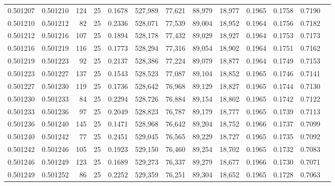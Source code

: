 \begin{tabular}{rrrrrrrrrrrrr}
0.501207 & 0.501210 & 124 &  25 &                                     0.1678 & 527,989 &  77,621 &  88,979 &  18,977 & 0.1965 & 0.1758 & 0.7190 \\
0.501210 & 0.501212 &  82 &  25 &                                     0.2336 & 528,071 &  77,539 &  89,004 &  18,952 & 0.1964 & 0.1756 & 0.7182 \\
0.501212 & 0.501216 & 107 &  25 &                                     0.1894 & 528,178 &  77,432 &  89,029 &  18,927 & 0.1964 & 0.1753 & 0.7173 \\
0.501216 & 0.501219 & 116 &  25 &                                     0.1773 & 528,294 &  77,316 &  89,054 &  18,902 & 0.1964 & 0.1751 & 0.7162 \\
0.501219 & 0.501223 &  92 &  25 &                                     0.2137 & 528,386 &  77,224 &  89,079 &  18,877 & 0.1964 & 0.1749 & 0.7153 \\
0.501223 & 0.501227 & 137 &  25 &                                     0.1543 & 528,523 &  77,087 &  89,104 &  18,852 & 0.1965 & 0.1746 & 0.7141 \\
0.501227 & 0.501230 & 119 &  25 &                                     0.1736 & 528,642 &  76,968 &  89,129 &  18,827 & 0.1965 & 0.1744 & 0.7130 \\
0.501230 & 0.501233 &  84 &  25 &                                     0.2294 & 528,726 &  76,884 &  89,154 &  18,802 & 0.1965 & 0.1742 & 0.7122 \\
0.501233 & 0.501236 &  97 &  25 &                                     0.2049 & 528,823 &  76,787 &  89,179 &  18,777 & 0.1965 & 0.1739 & 0.7113 \\
0.501236 & 0.501240 & 145 &  25 &                                     0.1471 & 528,968 &  76,642 &  89,204 &  18,752 & 0.1966 & 0.1737 & 0.7099 \\
0.501240 & 0.501242 &  77 &  25 &                                     0.2451 & 529,045 &  76,565 &  89,229 &  18,727 & 0.1965 & 0.1735 & 0.7092 \\
0.501242 & 0.501246 & 105 &  25 &                                     0.1923 & 529,150 &  76,460 &  89,254 &  18,702 & 0.1965 & 0.1732 & 0.7083 \\
0.501246 & 0.501249 & 123 &  25 &                                     0.1689 & 529,273 &  76,337 &  89,279 &  18,677 & 0.1966 & 0.1730 & 0.7071 \\
0.501249 & 0.501252 &  86 &  25 &                                     0.2252 & 529,359 &  76,251 &  89,304 &  18,652 & 0.1965 & 0.1728 & 0.7063 \\

\end{tabular}
